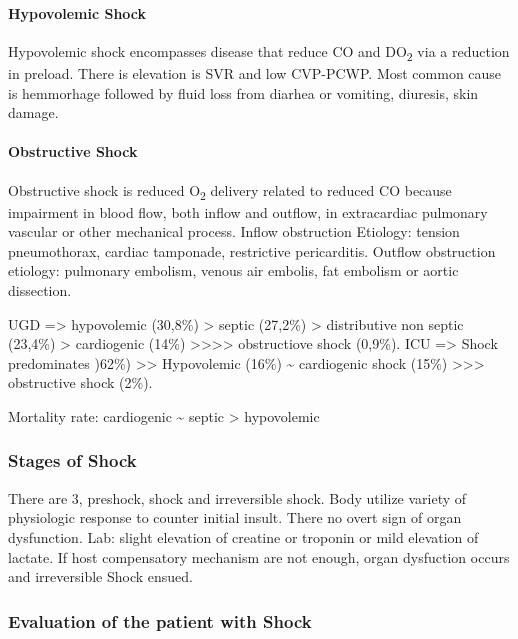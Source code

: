 \documentclass[
  letterpaper,
  DIV=11,
  numbers=noendperiod]{scrreprt}
\let\oldparagraph\paragraph
\renewcommand{\paragraph}[1]{\oldparagraph{#1}\mbox{}}
\begin{document}
\paragraph{Hypovolemic Shock}\label{hypovolemic-shock}

Hypovolemic shock encompasses disease that reduce CO and
DO\textsubscript{2} via a reduction in preload. There is elevation is
SVR and low CVP-PCWP. Most common cause is hemmorhage followed by fluid
loss from diarhea or vomiting, diuresis, skin damage.

\paragraph{Obstructive Shock}\label{obstructive-shock}

Obstructive shock is reduced O\textsubscript{2} delivery related to
reduced CO because impairment in blood flow, both inflow and outflow, in
extracardiac pulmonary vascular or other mechanical process. Inflow
obstruction Etiology: tension pneumothorax, cardiac tamponade,
restrictive pericarditis. Outflow obstruction etiology: pulmonary
embolism, venous air embolis, fat embolism or aortic dissection.

UGD =\textgreater{} hypovolemic (30,8\%) \textgreater{} septic (27,2\%)
\textgreater{} distributive non septic (23,4\%) \textgreater{}
cardiogenic (14\%) \textgreater\textgreater\textgreater\textgreater{}
obstructiove shock (0,9\%). ICU =\textgreater{} Shock predominates
)62\%) \textgreater\textgreater{} Hypovolemic (16\%) \textasciitilde{}
cardiogenic shock (15\%) \textgreater\textgreater\textgreater{}
obstructive shock (2\%).

Mortality rate: cardiogenic \textasciitilde{} septic \textgreater{}
hypovolemic

\subsubsection{Stages of Shock}\label{stages-of-shock}

There are 3, preshock, shock and irreversible shock. Body utilize
variety of physiologic response to counter initial insult. There no
overt sign of organ dysfunction. Lab: slight elevation of creatine or
troponin or mild elevation of lactate. If host compensatory mechanism
are not enough, organ dysfuction occurs and irreversible Shock ensued.

\subsubsection{Evaluation of the patient with
Shock}\label{evaluation-of-the-patient-with-shock}
\end{document}
